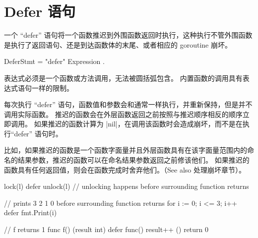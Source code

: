 \section{Defer 语句}
一个 ``defer'' 语句将一个函数推迟到外围函数返回时执行，这种执行不管外围函数是执行了返回语句、还是到达函数体的末尾、或者相应的 goroutine 崩坏。
\begin{EBNF}
DeferStmt = "defer" Expression .
\end{EBNF}

表达式必须是一个函数或方法调用，无法被圆括弧包含。
内置函数的调用具有表达式语句一样的限制。

每次执行 ``defer'' 语句，函数值和参数会和通常一样执行，并重新保持，但是并不调用实际函数。
推迟的函数会在外层函数返回之前按照与推迟顺序相反的顺序立即调用。
如果推迟的函数计算为 \code|nil|，在调用该函数时会造成崩坏，而不是在执行``defer'' 语句时。

比如，如果推迟的函数是一个函数字面量并且外层函数具有在该字面量范围内的命名的结果参数，推迟的函数可以在命名结果参数返回之前修该他们。
如果推迟的函数具有任何返回值，则会在函数完成时舍弃他们。（See also 处理崩坏章节）。
\begin{golang}
lock(l)
defer unlock(l)  // unlocking happens before surrounding function returns

// prints 3 2 1 0 before surrounding function returns
for i := 0; i <= 3; i++ {
	defer fmt.Print(i)
}

// f returns 1
func f() (result int) {
	defer func() {
		result++
	}()
	return 0
}
\end{golang}







